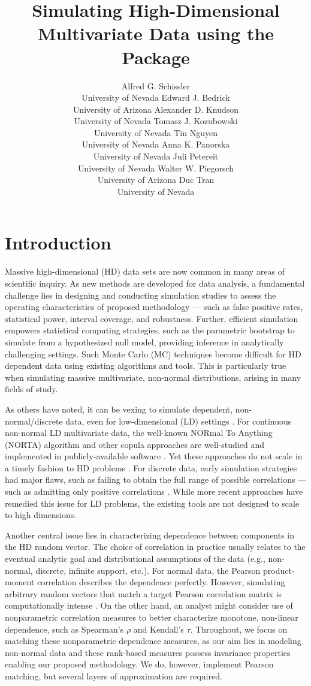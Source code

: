 \documentclass[
]{jss}
\author{
Alfred G. Schissler\\University of Nevada \And Edward J. Bedrick\\University of Arizona \And Alexander D. Knudson\\University of Nevada \AND Tomasz J. Kozubowski\\University of Nevada \And Tin Nguyen\\University of Nevada \And Anna K. Panorska\\University of Nevada \AND Juli Petereit\\University of Nevada \And Walter W. Piegorsch\\University of Arizona \And Duc Tran\\University of Nevada
}
\title{Simulating High-Dimensional Multivariate Data using the \pkg{Bigsimr} Package}
\begin{document}
\clearpage

\hypertarget{introduction}{%
\section{Introduction}\label{introduction}}


Massive high-dimensional (HD) data sets are now common in many areas of scientific inquiry. As new methods are developed for data analysis, a fundamental challenge lies in designing and conducting simulation studies to assess the operating characteristics of proposed methodology --- such as false positive rates, statistical power, interval coverage, and robustness. Further, efficient simulation empowers statistical computing strategies, such as the parametric bootstrap \citep{Chernick2008} to simulate from a hypothesized null model, providing inference in analytically challenging settings. Such Monte Carlo (MC) techniques become difficult for HD dependent data using existing algorithms and tools. This is particularly true when simulating massive multivariate, non-normal distributions, arising in many fields of study.

As others have noted, it can be vexing to simulate dependent, non-normal/discrete data, even for low-dimensional (LD) settings \citep{MB13, XZ19}. For continuous non-normal LD multivariate data, the well-known NORmal To Anything (NORTA) algorithm \citep{Cario1997} and other copula approaches \citep{Nelsen2007} are well-studied and implemented in publicly-available software \citep{Yan2007, Chen2001}. Yet these approaches do not scale in a timely fashion to HD problems \citep{Li2019gpu}. For discrete data, early simulation strategies had major flaws, such as failing to obtain the full range of possible correlations --- such as admitting only positive correlations \citep{Park1996}. While more recent approaches \citep{MB13, Xia17, BF17} have remedied this issue for LD problems, the existing tools are not designed to scale to high dimensions.

Another central issue lies in characterizing dependence between components in the HD random vector. The choice of correlation in practice usually relates to the eventual analytic goal and distributional assumptions of the data (e.g., non-normal, discrete, infinite support, etc.). For normal data, the Pearson product-moment correlation describes the dependence perfectly. However, simulating arbitrary random vectors that match a target Pearson correlation matrix is computationally intense \citep{Chen2001, Xia17}. On the other hand, an analyst might consider use of nonparametric correlation measures to better characterize monotone, non-linear dependence, such as Spearman's \(\rho\) and Kendall's \(\tau\). Throughout, we focus on matching these nonparametric dependence measures, as our aim lies in modeling non-normal data and these rank-based measures possess invariance properties enabling our proposed methodology. We do, however, implement Pearson matching, but several layers of approximation are required.
\end{document}
